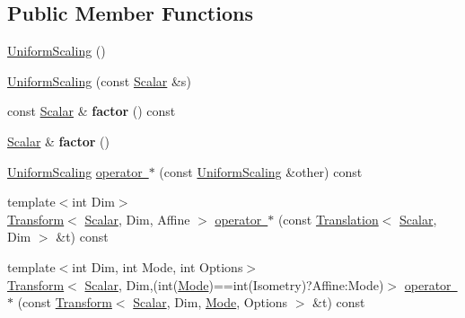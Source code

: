 \subsection*{Public Member Functions}
\begin{DoxyCompactItemize}
\item 
\mbox{\hyperlink{class_eigen_1_1_uniform_scaling_ab17e233af501c69ff47c0dd16f43cc39}{Uniform\+Scaling}} ()
\item 
\mbox{\hyperlink{class_eigen_1_1_uniform_scaling_a3a3e2fa318eb29c2c4f87e23a8a75144}{Uniform\+Scaling}} (const \mbox{\hyperlink{class_eigen_1_1_uniform_scaling_a04c4339f58f1210c5d4d34b1bd7ae283}{Scalar}} \&s)
\item 
\mbox{\label{class_eigen_1_1_uniform_scaling_a600949d7c5ed124adacaba53b631b6e6}} 
const \mbox{\hyperlink{class_eigen_1_1_uniform_scaling_a04c4339f58f1210c5d4d34b1bd7ae283}{Scalar}} \& {\bfseries factor} () const
\item 
\mbox{\label{class_eigen_1_1_uniform_scaling_a380501e65319cfa832da20730f0bf122}} 
\mbox{\hyperlink{class_eigen_1_1_uniform_scaling_a04c4339f58f1210c5d4d34b1bd7ae283}{Scalar}} \& {\bfseries factor} ()
\item 
\mbox{\hyperlink{class_eigen_1_1_uniform_scaling}{Uniform\+Scaling}} \mbox{\hyperlink{class_eigen_1_1_uniform_scaling_ab847241b81e843c18f3ad2005b920c26}{operator $\ast$}} (const \mbox{\hyperlink{class_eigen_1_1_uniform_scaling}{Uniform\+Scaling}} \&other) const
\item 
{\footnotesize template$<$int Dim$>$ }\\\mbox{\hyperlink{class_eigen_1_1_transform}{Transform}}$<$ \mbox{\hyperlink{class_eigen_1_1_uniform_scaling_a04c4339f58f1210c5d4d34b1bd7ae283}{Scalar}}, Dim, Affine $>$ \mbox{\hyperlink{class_eigen_1_1_uniform_scaling_a5af613323ea7b64f6cdd79b146471441}{operator $\ast$}} (const \mbox{\hyperlink{class_eigen_1_1_translation}{Translation}}$<$ \mbox{\hyperlink{class_eigen_1_1_uniform_scaling_a04c4339f58f1210c5d4d34b1bd7ae283}{Scalar}}, Dim $>$ \&t) const
\item 
{\footnotesize template$<$int Dim, int Mode, int Options$>$ }\\\mbox{\hyperlink{class_eigen_1_1_transform}{Transform}}$<$ \mbox{\hyperlink{class_eigen_1_1_uniform_scaling_a04c4339f58f1210c5d4d34b1bd7ae283}{Scalar}}, Dim,(int(\mbox{\hyperlink{struct_mode}{Mode}})==int(Isometry)?Affine\+:\+Mode)$>$ \mbox{\hyperlink{class_eigen_1_1_uniform_scaling_a7756799d406f099c7ba5b198a59d4497}{operator $\ast$}} (const \mbox{\hyperlink{class_eigen_1_1_transform}{Transform}}$<$ \mbox{\hyperlink{class_eigen_1_1_uniform_scaling_a04c4339f58f1210c5d4d34b1bd7ae283}{Scalar}}, Dim, \mbox{\hyperlink{struct_mode}{Mode}}, Options $>$ \&t) const

\end{DoxyCompactItemize}

